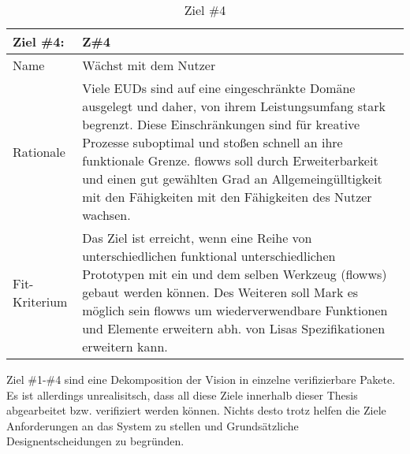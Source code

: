 \begin{table}[h]
\caption{Ziel \#4}
\label{tab:ziel4}
\begin{tabularx}{\textwidth}{lX}
\hline
\rowcolor[HTML]{EFEFEF} 
Ziel \#4:     & Z\#4 \\ \hline
Name          & Wächst mit dem Nutzer \\ \hline
Rationale     & Viele EUDs sind auf eine eingeschränkte Domäne ausgelegt und daher, von ihrem Leistungsumfang stark begrenzt. Diese Einschränkungen sind für kreative Prozesse suboptimal und stoßen schnell an ihre funktionale Grenze. flowws soll durch Erweiterbarkeit und einen gut gewählten Grad an Allgemeingülltigkeit mit den Fähigkeiten mit den Fähigkeiten des Nutzer wachsen. \\ \hline
Fit-Kriterium & Das Ziel ist erreicht, wenn eine Reihe von unterschiedlichen funktional unterschiedlichen Prototypen mit ein und dem selben Werkzeug (flowws) gebaut werden können. Des Weiteren soll Mark es möglich sein flowws um wiederverwendbare Funktionen und Elemente erweitern abh. von Lisas Spezifikationen erweitern kann.  \\ \hline
\end{tabularx}
\end{table}

Ziel \#1-\#4 sind eine Dekomposition der Vision in einzelne verifizierbare Pakete. Es ist allerdings unrealisitsch, dass all diese Ziele innerhalb dieser Thesis abgearbeitet bzw. verifiziert werden können. Nichts desto trotz helfen die Ziele Anforderungen an das System zu stellen und Grundsätzliche Designentscheidungen zu begründen.


